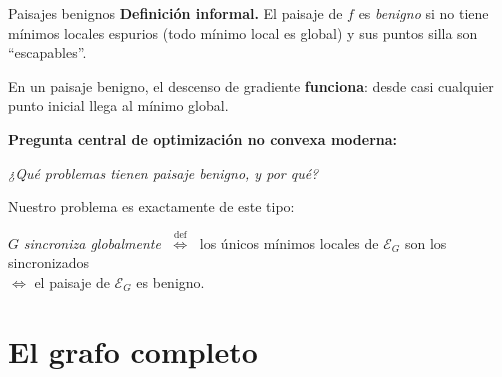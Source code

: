 \documentclass[10pt,aspectratio=169]{beamer}
\newcommand{\E}{\mathcal{E}}
\begin{document}
\begin{frame}{Paisajes benignos}
\textbf{Definición informal.} El paisaje de $f$ es \emph{benigno} si no tiene mínimos locales espurios
(todo mínimo local es global) y sus puntos silla son ``escapables''.
\medskip

En un paisaje benigno, el descenso de gradiente \textbf{funciona}: desde casi cualquier punto inicial llega al mínimo global.
\medskip
\pause

\textbf{Pregunta central de optimización no convexa moderna:}
\begin{center}
\emph{¿Qué problemas tienen paisaje benigno, y por qué?}
\end{center}
\medskip
\pause

Nuestro problema es exactamente de este tipo:
\begin{center}
$G$ \emph{sincroniza globalmente} $\;\stackrel{\text{def}}{\iff}\;$ los únicos mínimos locales de $\E_G$ son los sincronizados\\[2pt]
$\iff$ el paisaje de $\E_G$ es benigno.
\end{center}
\end{frame}

\section{El grafo completo}
\end{document}
